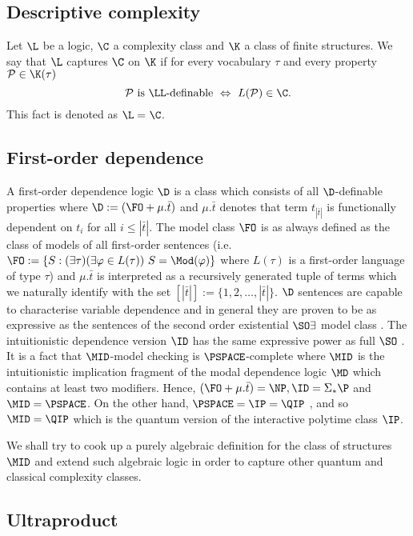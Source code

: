 \subsection{Descriptive complexity}
Let $\L$ be a logic, $\C$ a complexity class and $\K$ a class of finite structures. We say that $\L$ captures $\C$ on $\K$ if for every vocabulary $\tau$ and every property $\mathcal{P}\in\K(\tau)$
\[\mathcal{P}\text{ is $\LL$-definable }\Leftrightarrow\ L(\mathcal{P})\in\C.\] This fact is denoted as $\L =_{} \C$. 


\subsection{First-order dependence}

A first-order dependence logic $\D$ is a class which consists of all $\D$-definable properties where $\D := (\FO + \mu.\bar{t})$ and $\mu.\bar{t}$ denotes that term $t_{|\bar{t}|}$ is functionally dependent on $t_{i}$ for all $i\leq |\bar{t}|$. The model class $\FO$ is as always defined as the class of models of all first-order sentences (i.e. $\FO:= \{S:(\exists\tau)(\exists\varphi\in L(\tau))\ S=\Mod(\varphi)\}$ where $L(\tau)$ is a first-order language of type $\tau$) and $\mu.\bar{t}$ is interpreted as a recursively generated tuple of terms which we naturally identify with the set $[|\bar{t}|] := \{1,2,\dots,|\bar{t}|\}$. $\D$ sentences are capable to characterise variable dependence and in general they are proven to be as expressive as the sentences of the second order existential $\SO\exists$ model class \cite{dep}. The intuitionistic dependence version $\ID$ has the same expressive power as full $\SO$ \cite{dep}. It is a fact that $\MID$-model checking is $\PSPACE$-complete \cite{dep} where $\MID$ is the intuitionistic implication fragment of the modal dependence logic $\MD$ which contains at least two modifiers. Hence, $(\FO + \mu.\bar{t}) = \NP, \ID = \Sigma_{\ast}\P$ and $\MID = \PSPACE$.  On the other hand, $\PSPACE = \IP = \QIP$ \cite{qip}, and so $\MID = \QIP$ which is the quantum version of the interactive polytime class $\IP$.

We shall try to cook up a purely algebraic definition for the class of structures $\MID$ and extend such algebraic logic in order to capture other quantum and classical complexity classes. 

\subsection{Ultraproduct}

